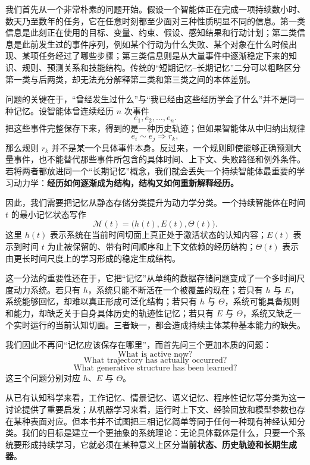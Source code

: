 我们首先从一个非常朴素的问题开始。假设一个智能体正在完成一项持续数小时、数天乃至数年的任务，它在任意时刻都至少面对三种性质明显不同的信息。第一类信息是此刻正在使用的目标、变量、约束、假设、感知结果和行动计划；第二类信息是此前发生过的事件序列，例如某个行动为什么失败、某个对象在什么时候出现、某项任务经过了哪些步骤；第三类信息则是从大量事件中逐渐稳定下来的知识、规则、预测关系和技能结构。传统的“短期记忆--长期记忆”二分可以粗略区分第一类与后两类，却无法充分解释第二类和第三类之间的本体差别。

问题的关键在于，“曾经发生过什么”与“我已经由这些经历学会了什么”并不是同一种记忆。设智能体曾连续经历 $n$ 次事件
\[
e_1,e_2,\ldots,e_n.
\]
把这些事件完整保存下来，得到的是一种历史轨迹；但如果智能体从中归纳出规律
\[
e_i \sim e_j
\Longrightarrow
r_k,
\]
那么规则 $r_k$ 并不是某一个具体事件本身。反过来，一个规则即使能够正确预测大量事件，也不能替代那些事件所包含的具体时间、上下文、失败路径和例外条件。若将两者都放进同一个“长期记忆”概念，我们就会丢失一个持续智能体最重要的学习动力学：\textbf{经历如何逐渐成为结构，结构又如何重新解释经历。}

因此，我们需要把记忆从静态存储分类提升为动力学分类。一个持续智能体在时间 $t$ 的最小记忆状态写作
\[
\mathcal{M}(t)
=
\bigl(
h(t),E(t),\Theta(t)
\bigr).
\]
这里 $h(t)$ 表示系统在当前时间切面上真正处于激活状态的认知内容；$E(t)$ 表示到时间 $t$ 为止被保留的、带有时间顺序和上下文依赖的经历结构；$\Theta(t)$ 表示由更长时间尺度上的学习形成的稳定生成结构。

这一分法的重要性还在于，它把“记忆”从单纯的数据存储问题变成了一个多时间尺度动力系统。若只有 $h$，系统只能不断活在一个被覆盖的现在；若只有 $h$ 与 $E$，系统能够回忆，却难以真正形成可泛化结构；若只有 $h$ 与 $\Theta$，系统可能具备规则和能力，却缺乏关于自身具体历史的轨迹性记忆；若只有 $E$ 与 $\Theta$，系统又缺乏一个实时运行的当前认知切面。三者缺一，都会造成持续主体某种基本能力的缺失。

我们因此不再问“记忆应该保存在哪里”，而首先问三个更加本质的问题：
\[
\text{What is active now?}
\]
\[
\text{What trajectory has actually occurred?}
\]
\[
\text{What generative structure has been learned?}
\]
这三个问题分别对应 $h$、$E$ 与 $\Theta$。

从已有认知科学来看，工作记忆、情景记忆、语义记忆、程序性记忆等分类为这一讨论提供了重要启发；从机器学习来看，运行时上下文、经验回放和模型参数也存在某种表面对应。但本书并不试图把三相记忆简单等同于任何一种现有神经认知分类。我们的目标是建立一个更抽象的系统理论：无论具体载体是什么，只要一个系统要形成持续学习，它就必须在某种意义上区分\textbf{当前状态、历史轨迹和长期生成器}。


